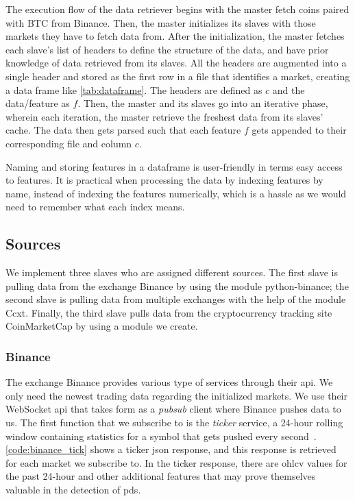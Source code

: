The execution flow of the data retriever begins with the master fetch coins paired with BTC from Binance. Then, the master initializes its slaves with those markets they have to fetch data from. After the initialization, the master fetches each slave's list of headers to define the structure of the data, and have prior knowledge of data retrieved from its slaves. All the headers are augmented into a single header and stored as the first row in a file that identifies a market, creating a data frame like \autoref{tab:dataframe}.  The headers are defined as $c$ and the data/feature as $f$. Then, the master and its slaves go into an iterative phase, wherein each iteration, the master retrieve the freshest data from its slaves' cache. The data then gets parsed such that each feature $f$ gets appended to their corresponding file and column $c$.
 


Naming and storing features in a dataframe is user-friendly in terms easy access to features. It is practical when processing the data by indexing features by name, instead of indexing the features numerically, which is a hassle as we would need to remember what each index means.

\subsection{Sources}
We implement three slaves who are assigned different sources. The first slave is pulling data from the exchange Binance by using the module python-binance; the second slave is pulling data from multiple exchanges with the help of the module Ccxt. Finally, the third slave pulls data from the cryptocurrency tracking site CoinMarketCap by using a module we create.

\subsubsection{Binance}
The exchange Binance provides various type of services through their \ac{api}. We only need the newest trading data regarding the initialized markets. We use their WebSocket \ac{api} that takes form as a \emph{pubsub} client where Binance pushes data to us. The first function that we subscribe to is the \emph{ticker} service, a 24-hour rolling window containing statistics for a symbol that gets pushed every second~\cite{binance_git}. \autoref{code:binance_tick} shows a ticker \ac{json} response, and this response is retrieved for each market we subscribe to. In the ticker response, there are \ac{ohlcv} values for the past 24-hour and other additional features that may prove themselves valuable in the detection of \acp{pd}.

